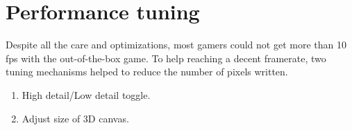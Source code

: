 
\vspace{-1.25cm}
\section{Performance tuning}
Despite all the care and optimizations, most gamers could not get more than 10 fps with the out-of-the-box game. To help reaching a decent framerate, two tuning mechanisms helped to reduce the number of pixels written.
\begin{enumerate}
\item High detail/Low detail toggle.
\item Adjust size of 3D canvas.
\end{enumerate}
\par
{}\\
\par



